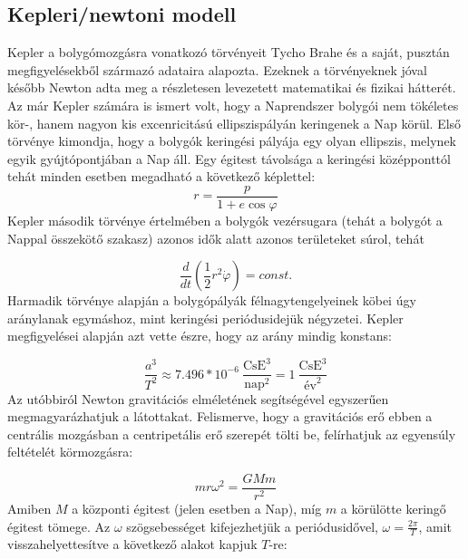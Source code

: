 \begin{multicols}{2}
\subsection{Kepleri/newtoni modell} \label{sub:2.1}
Kepler a bolygómozgásra vonatkozó törvényeit Tycho Brahe és a saját, pusztán megfigyelésekből származó adataira alapozta. Ezeknek a törvényeknek jóval később Newton adta meg a részletesen levezetett matematikai és fizikai hátterét. \\
Az már Kepler számára is ismert volt, hogy a Naprendszer bolygói nem tökéletes kör-, hanem nagyon kis excenricitású ellipszispályán keringenek a Nap körül. Első törvénye kimondja, hogy a bolygók keringési pályája egy olyan ellipszis, melynek egyik gyújtópontjában a Nap áll. Egy égitest távolsága a keringési középponttól tehát minden esetben megadható a következő képlettel:
\begin{equation}
    r
    =
    \frac{p}{1 + e \cos{\varphi}}
\end{equation}
Kepler második törvénye értelmében a bolygók vezérsugara (tehát a bolygót a Nappal összekötő szakasz) azonos idők alatt azonos területeket súrol, tehát

\begin{equation}
    \frac{d}{dt} \left( \frac{1}{2} r^{2} \dot{\varphi} \right)
    =
    const.
\end{equation}
Harmadik törvénye alapján a bolygópályák félnagytengelyeinek köbei úgy aránylanak egymáshoz, mint keringési periódusidejük négyzetei. Kepler megfigyelései alapján azt vette észre, hogy az arány mindig konstans:

\begin{equation}
    \frac{a^{3}}{T^{2}}
    \approx
    7.496 * 10^{-6}\ \frac{\text{CsE}^{3}}{\text{nap}^{2}}
    =
    1\ \frac{\text{CsE}^{3}}{\text{év}^{2}}
\end{equation}
Az utóbbiról Newton gravitációs elméletének segítségével egyszerűen megmagyarázhatjuk a látottakat. Felismerve, hogy a gravitációs erő ebben a centrális mozgásban a centripetális erő szerepét tölti be, felírhatjuk az egyensúly feltételét körmozgásra:

\begin{equation}
    m r \omega^{2}
    =
    \frac{GMm}{r^{2}}
\end{equation}
Amiben $M$ a központi égitest (jelen esetben a Nap), míg $m$ a körülötte keringő égitest tömege. Az $\omega$ szögsebességet kifejezhetjük a periódusidővel, $\omega = \frac{2 \pi}{T}$, amit visszahelyettesítve a következő alakot kapjuk $T$-re:


\end{multicols}
